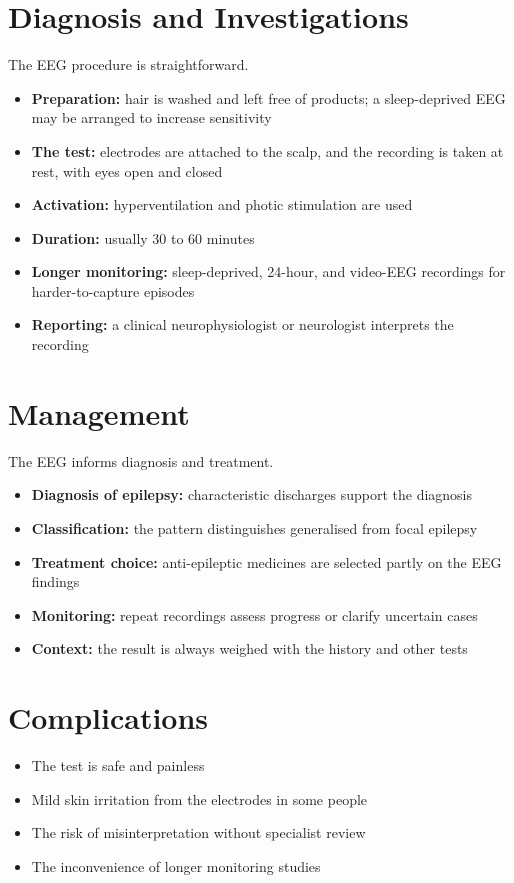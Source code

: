 \section*{Diagnosis and Investigations}
The EEG procedure is straightforward.
\begin{itemize}
    \item \textbf{Preparation:} hair is washed and left free of products; a sleep-deprived EEG may be arranged to increase sensitivity
    \item \textbf{The test:} electrodes are attached to the scalp, and the recording is taken at rest, with eyes open and closed
    \item \textbf{Activation:} hyperventilation and photic stimulation are used
    \item \textbf{Duration:} usually 30 to 60 minutes
    \item \textbf{Longer monitoring:} sleep-deprived, 24-hour, and video-EEG recordings for harder-to-capture episodes
    \item \textbf{Reporting:} a clinical neurophysiologist or neurologist interprets the recording
\end{itemize}

\section*{Management}
The EEG informs diagnosis and treatment.
\begin{itemize}
    \item \textbf{Diagnosis of epilepsy:} characteristic discharges support the diagnosis
    \item \textbf{Classification:} the pattern distinguishes generalised from focal epilepsy
    \item \textbf{Treatment choice:} anti-epileptic medicines are selected partly on the EEG findings
    \item \textbf{Monitoring:} repeat recordings assess progress or clarify uncertain cases
    \item \textbf{Context:} the result is always weighed with the history and other tests
\end{itemize}

\section*{Complications}
\begin{itemize}
    \item The test is safe and painless
    \item Mild skin irritation from the electrodes in some people
    \item The risk of misinterpretation without specialist review
    \item The inconvenience of longer monitoring studies
\end{itemize}

